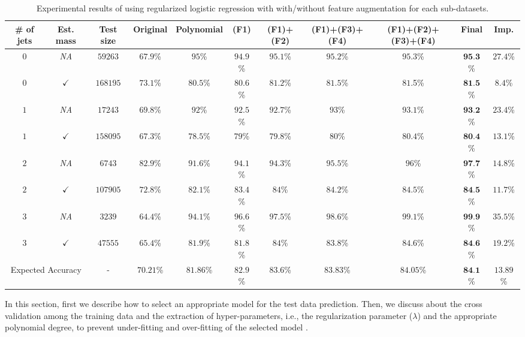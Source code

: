 \documentclass[8pt,conference,compsocconf]{IEEEtran}
\begin{document}
\begin{table*}[ht]
	\caption{Experimental results of using regularized logistic regression with with/without feature augmentation for each sub-datasets.}
	\def\arraystretch{1.1}\tabcolsep 5.2pt
	\label{tab:results}
		\begin{tabular}{|c|c||c|c|c||c|c|c|c||c||c|}
			\hline
			 \# of jets & Est. mass  &Test size	   &Original	& Polynomial& (F1)			&  (F1)+(F2)  & (F1)+(F3)+(F4)& (F1)+(F2)+(F3)+(F4)&\textbf{Final}&Imp.\\
			\hline \hline
			$0$ & \textit{NA}	  & $59263$ 	&$ 67.9$\%	& $95$\%	& $94.9$\%  & $95.1$\% & $95.2$\% & $95.3$\%  & $\textbf{95.3}$\% & $27.4$\%  \\
			\hline
			$0$ & $\checkmark$  	& $168195$   & $73.1$\%	 & $80.5$\% & $80.6$\%	& $81.2$\% & $81.5$\% & $81.$5\%  & $\textbf{81.5}$\% & $8.4$\%     \\
			\hline
			$1$ & \textit{NA}  	  & $17243$     & $69.8$\%  & $92$\%    & $92.5$\%  & $92.7$\% & $93$\%   & $93.1$\%   & $\textbf{93.2}$\% & $23.4$\%     \\
			\hline
			$1$ & $\checkmark$  			& $158095$   & $67.3$\%  & $78.5$\% & $79$\% 	 & $79.8$\% & $80$\%   & $80.4$\%   & $\textbf{80.4}$\% & $13.1$\%      \\
			\hline
			$2$ & \textit{NA} 	  & $6743$		& $82.9$\%  & $91.6$\% & $94.1$\% 	& $94.3$\% & $95.5$\% & $96$\%	   & $\textbf{97.7}$\% & $14.8$\% \\
			\hline
			$2$ & $\checkmark$  			& $107905$	& $72.8$\%  & $82.1$\% & $83.4$\% 	& $84$\%	& $84.2$\% & $84.5$\%	& $\textbf{84.5}$\%& $11.7$\%    \\
			\hline
			$3$ & \textit{NA} 	  & $3239$	    & $64.4$\% & $94.1$\% & $96.6$\%	& $97.5$\% & $98.6$\% & $99.1$\%  & $\textbf{99.9}$\% & $35.5$\%  \\
			\hline
			$3$ & $\checkmark$   			& $47555$	& $65.4$\%  & $81.9$\% & $81.8$\%	 & $84$\% 	 & $83.8$\% & $84.6$\%  & $\textbf{84.6}$\%  & $19.2$\%    \\
			\hline
			\hline
			\multicolumn{2}{|c||}{Expected Accuracy}	  & - & $70.21$\%& $81.86$\% & $82.9$\%	 & $83.6$\%& $83.83$\% & $84.05$\%  & $\textbf{84.1}$\%  & $13.89$\%    \\
			\hline
	\end{tabular}
\end{table*}
In this section, first we describe how to select an appropriate model for the test data prediction. Then, we discuss about the cross validation among the training data and the extraction of hyper-parameters, i.e., the regularization parameter ($\lambda$) and the appropriate polynomial degree, to prevent under-fitting and over-fitting of the selected model .
\end{document}

